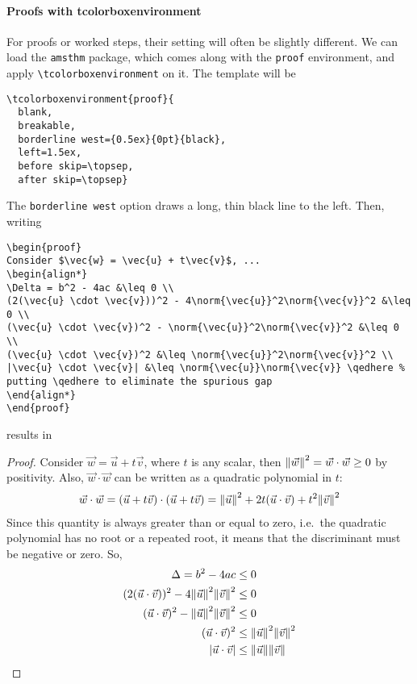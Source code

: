 \paragraph{Proofs with tcolorboxenvironment} For proofs or worked steps, their setting will often be slightly different. We can load the \texttt{amsthm} package, which comes along with the \texttt{proof} environment, and apply \texttt{\textbackslash tcolorboxenvironment} on it. The template will be
\begin{lstlisting}
\tcolorboxenvironment{proof}{
  blank,
  breakable,
  borderline west={0.5ex}{0pt}{black},
  left=1.5ex,
  before skip=\topsep,
  after skip=\topsep} 
\end{lstlisting}
The \texttt{borderline west} option draws a long, thin black line to the left. Then, writing
\begin{lstlisting}
\begin{proof}
Consider $\vec{w} = \vec{u} + t\vec{v}$, ...
\begin{align*}
\Delta = b^2 - 4ac &\leq 0 \\
(2(\vec{u} \cdot \vec{v}))^2 - 4\norm{\vec{u}}^2\norm{\vec{v}}^2 &\leq 0 \\
(\vec{u} \cdot \vec{v})^2 - \norm{\vec{u}}^2\norm{\vec{v}}^2 &\leq 0 \\
(\vec{u} \cdot \vec{v})^2 &\leq \norm{\vec{u}}^2\norm{\vec{v}}^2 \\
|\vec{u} \cdot \vec{v}| &\leq \norm{\vec{u}}\norm{\vec{v}} \qedhere % putting \qedhere to eliminate the spurious gap
\end{align*}
\end{proof}
\end{lstlisting}
results in
\begin{proof}
Consider $\vec{w} = \vec{u} + t\vec{v}$, where $t$ is any scalar, then $\norm{\vec{w}}^2 = \vec{w}\cdot\vec{w} \geq 0$ by positivity. Also, $\vec{w}\cdot\vec{w}$ can be written as a quadratic polynomial in $t$:
\begin{align*}
\vec{w}\cdot\vec{w} = (\vec{u} + t\vec{v}) \cdot (\vec{u} + t\vec{v}) = \norm{\vec{u}}^2 + 2t(\vec{u} \cdot \vec{v}) + t^2\norm{\vec{v}}^2
\end{align*}
Since this quantity is always greater than or equal to zero, i.e.\ the quadratic polynomial has no root or a repeated root, it means that the discriminant must be negative or zero. So,
\begin{align*}
\Delta = b^2 - 4ac &\leq 0 \\
(2(\vec{u} \cdot \vec{v}))^2 - 4\norm{\vec{u}}^2\norm{\vec{v}}^2 &\leq 0 \\
(\vec{u} \cdot \vec{v})^2 - \norm{\vec{u}}^2\norm{\vec{v}}^2 &\leq 0 \\
(\vec{u} \cdot \vec{v})^2 &\leq \norm{\vec{u}}^2\norm{\vec{v}}^2 \\
|\vec{u} \cdot \vec{v}| &\leq \norm{\vec{u}}\norm{\vec{v}} \qedhere
\end{align*}
\end{proof}
